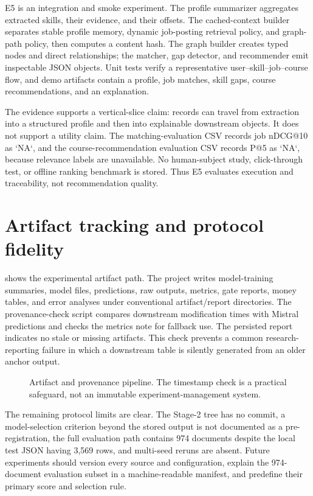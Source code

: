 E5 is an integration and smoke experiment. The profile summarizer aggregates extracted skills, their evidence, and their offsets. The cached-context builder separates stable profile memory, dynamic job-posting retrieval policy, and graph-path policy, then computes a content hash. The graph builder creates typed nodes and direct relationships; the matcher, gap detector, and recommender emit inspectable JSON objects. Unit tests verify a representative user--skill--job--course flow, and demo artifacts contain a profile, job matches, skill gaps, course recommendations, and an explanation.

The evidence supports a vertical-slice claim: records can travel from extraction into a structured profile and then into explainable downstream objects. It does not support a utility claim. The matching-evaluation CSV records job nDCG@10 as `NA`, and the course-recommendation evaluation CSV records P@5 as `NA`, because relevance labels are unavailable. No human-subject study, click-through test, or offline ranking benchmark is stored. Thus E5 evaluates execution and traceability, not recommendation quality.

\section{Artifact tracking and protocol fidelity}

 shows the experimental artifact path. The project writes model-training summaries, model files, predictions, raw outputs, metrics, gate reports, money tables, and error analyses under conventional artifact/report directories. The provenance-check script compares downstream modification times with Mistral predictions and checks the metrics note for fallback use. The persisted report indicates no stale or missing artifacts. This check prevents a common research-reporting failure in which a downstream table is silently generated from an older anchor output.

\begin{figure}[H]
\centering

\caption{Artifact and provenance pipeline. The timestamp check is a practical safeguard, not an immutable experiment-management system.}
\label{fig:provenance}
\end{figure}

The remaining protocol limits are clear. The Stage-2 tree has no commit, a model-selection criterion beyond the stored output is not documented as a pre-registration, the full evaluation path contains 974 documents despite the local test JSON having 3,569 rows, and multi-seed reruns are absent. Future experiments should version every source and configuration, explain the 974-document evaluation subset in a machine-readable manifest, and predefine their primary score and selection rule.
